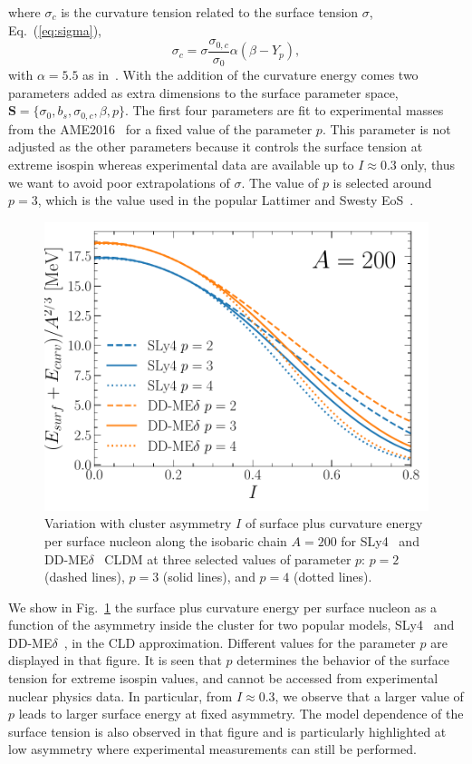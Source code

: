 %
where $\sigma_c$ is the curvature tension related to the surface tension
$\sigma$, Eq.~(\ref{eq:sigma}),
%
\begin{equation}
  \sigma_c =
  \sigma\frac{\sigma_{0,c}}{\sigma_0}\alpha(\beta-Y_p),\label{eq:sigmac}
\end{equation}
%
with $\alpha = 5.5$ as in~\cite{Newton2012}. With the addition of the
curvature energy comes two parameters added as extra dimensions to 
the surface parameter space, $\bm{S} = \{\sigma_0, b_s, \sigma_{0,c}, \beta,
p\}$. 
The first four parameters are fit to experimental masses from the
AME2016~\cite{Huang2017} for a fixed value of the parameter $p$. This parameter 
is not adjusted as the other parameters because it controls the surface tension 
at extreme isospin whereas experimental data are available up to $I \approx 0.3$ 
only, thus we want to avoid poor extrapolations of $\sigma$. The value of $p$ 
is selected around $p=3$, which is the value used in the popular Lattimer and 
Swesty EoS~\cite{Lattimer1991}.
%
\begin{figure}[!t]
\begin{center}
  \includegraphics[width=0.8\linewidth]{figures/surfenpersurfnuc.pdf}
\end{center}
\caption[Surface plus curvature energy per surface nucleon versus asymmetry]{Variation 
  with cluster asymmetry $I$ of surface plus curvature energy per
  surface nucleon along the isobaric chain $A=200$ for SLy4~\cite{Chabanat1998} and
DD-ME$\delta$~\cite{RocaMaza2011} CLDM at three selected 
values of parameter $p$: $p=2$ (dashed lines), $p=3$ (solid lines), and $p=4$
(dotted lines).}\label{fig:surfenpersurfnuc}
\end{figure}
%
We show in Fig.~\ref{fig:surfenpersurfnuc} the surface plus curvature energy
per surface nucleon as a function of the asymmetry inside the cluster for two
popular models, SLy4~\cite{Chabanat1998} and DD-ME$\delta$~\cite{RocaMaza2011},
in the CLD approximation. Different values for the parameter $p$ are displayed 
in that figure. It is seen that $p$ determines the behavior of the surface
tension for extreme isospin values, and cannot be accessed from experimental
nuclear physics data. In particular, from $I \approx 0.3$, we observe that a 
larger value of $p$ leads to larger surface energy at fixed asymmetry. The
model dependence of the surface tension is also observed in that figure and is
particularly highlighted at low asymmetry where experimental measurements can 
still be performed.

